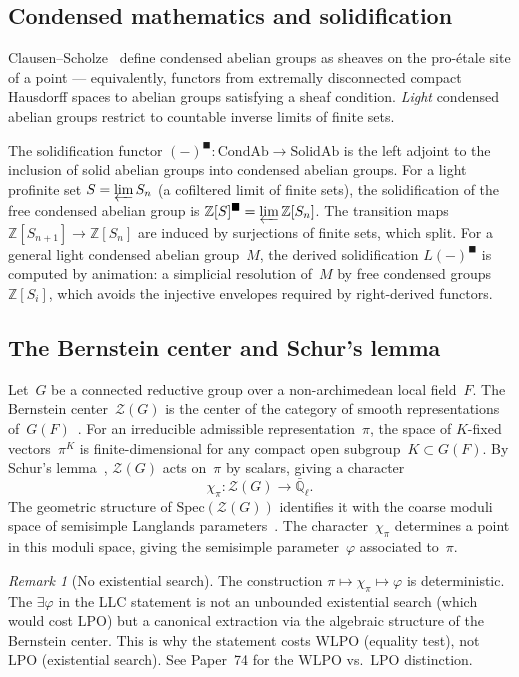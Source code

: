 \documentclass[12pt, a4paper]{article}
\theoremstyle{plain}
\theoremstyle{definition}
\theoremstyle{remark}
\newtheorem{remark}[theorem]{Remark}
\newcommand{\WLPO}{\mathrm{WLPO}}
\newcommand{\LPO}{\mathrm{LPO}}
\begin{document}
\subsection{Condensed mathematics and solidification}

Clausen--Scholze~\cite{clausen-scholze} define condensed abelian
groups as sheaves on the pro-\'etale site of a point --- equivalently,
functors from extremally disconnected compact Hausdorff spaces to
abelian groups satisfying a sheaf condition.  \emph{Light} condensed
abelian groups restrict to countable inverse limits of finite sets.

The solidification functor $(-)^\blacksquare \colon \mathrm{CondAb}
\to \mathrm{SolidAb}$ is the left adjoint to the inclusion of solid
abelian groups into condensed abelian groups.  For a light profinite
set $S = \varprojlim S_n$ (a cofiltered limit of finite sets), the
solidification of the free condensed abelian group is
$\mathbb{Z}[S]^\blacksquare = \varprojlim \mathbb{Z}[S_n]$.
The transition maps $\mathbb{Z}[S_{n+1}] \to \mathbb{Z}[S_n]$ are
induced by surjections of finite sets, which split.  For a general
light condensed abelian group~$M$, the derived solidification
$L(-)^\blacksquare$ is computed by animation: a simplicial
resolution of~$M$ by free condensed groups $\mathbb{Z}[S_i]$,
which avoids the injective envelopes required by right-derived
functors.

\subsection{The Bernstein center and Schur's lemma}

Let~$G$ be a connected reductive group over a non-archimedean
local field~$F$.  The Bernstein center~$\mathcal{Z}(G)$ is the
center of the category of smooth representations
of~$G(F)$~\cite{bernstein, bump}.
For an irreducible admissible representation~$\pi$, the space
of $K$-fixed vectors~$\pi^K$ is finite-dimensional for any
compact open subgroup~$K \subset G(F)$.  By Schur's
lemma~\cite{bernstein}, $\mathcal{Z}(G)$ acts on~$\pi$ by
scalars, giving a character
\[
  \chi_\pi \colon \mathcal{Z}(G) \to \bar{\mathbb{Q}}_\ell.
\]
The geometric structure of $\mathrm{Spec}(\mathcal{Z}(G))$ identifies
it with the coarse moduli space of semisimple Langlands
parameters~\cite{fargues-scholze}.  The character~$\chi_\pi$
determines a point in this moduli space, giving the semisimple
parameter~$\varphi$ associated to~$\pi$.

\begin{remark}[No existential search]\label{rem:no-search}
The construction $\pi \mapsto \chi_\pi \mapsto \varphi$ is
deterministic.  The $\exists\varphi$ in the LLC statement is
not an unbounded existential search (which would cost $\LPO$) but
a canonical extraction via the algebraic structure of the Bernstein
center.  This is why the statement costs $\WLPO$ (equality test),
not $\LPO$ (existential search).  See Paper~74 for the $\WLPO$
vs.\ $\LPO$ distinction.
\end{remark}
\end{document}
